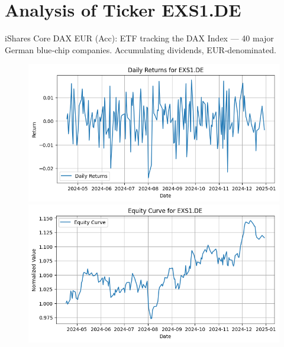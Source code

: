 \documentclass{article}%
\begin{document}
%
\newpage

%
\section*{Analysis of Ticker EXS1.DE}%
\label{sec:AnalysisofTickerEXS1.DE}%
iShares Core DAX EUR (Acc): ETF tracking the DAX Index — 40 major German blue‑chip companies. Accumulating dividends, EUR‑denominated.%


\begin{figure}[htbp]%
\begin{minipage}{0.49\textwidth}%
\includegraphics[width=\linewidth]{ticker_images/EXS1.DE_daily_returns.png}%
\end{minipage}%
\begin{minipage}{0.49\textwidth}%
\includegraphics[width=\linewidth]{ticker_images/EXS1.DE_equity_curve.png}%
\end{minipage}%
\end{figure}

%
\end{document}
